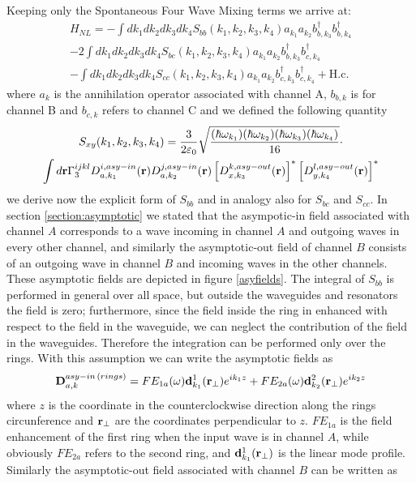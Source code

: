 Keeping only the Spontaneous Four Wave Mixing terms we arrive at:
\begin{multline}H_{NL} = -\int dk_1dk_2dk_3dk_4S_{bb}(k_1,k_2,k_3,k_4)a_{k_1}a_{k_2}b_{b,k_3}^\dagger b_{b,k_4}^\dagger \\-2\int dk_1dk_2dk_3dk_4S_{bc}(k_1,k_2,k_3,k_4)a_{k_1}a_{k_2}b_{b,k_3}^\dagger b_{c,k_4}^\dagger\\ -\int dk_1dk_2dk_3dk_4S_{cc}(k_1,k_2,k_3,k_4)a_{k_1}a_{k_2}b_{c,k_3}^\dagger b_{c,k_4}^\dagger +\text{H.c.}\end{multline}
where $a_k$ is the annihilation operator associated with channel A, $b_{b,k}$ is for channel B and $b_{c,k}$ refers to channel C and we defined the following quantity
\begin{multline}\label{S}
S_{xy}(k_1,k_2,k_3,k_4) = \frac{3}{2\varepsilon_0}\sqrt{\frac{(\hbar\omega_{k_1})(\hbar\omega_{k_2})(\hbar\omega_{k_3})(\hbar\omega_{k_4})}{16}}\cdot \\ \int d\mathbf{r} \Gamma^{ijkl}_3D^{i,asy-in}_{a,k_1}(\mathbf{r})D^{j,asy-in}_{a,k_2}(\mathbf{r})\left[D^{k,asy-out}_{x,k_3}(\mathbf{r})\right]^*\left[D^{l,asy-out}_{y,k_4}(\mathbf{r})\right]^*
\end{multline}
we derive now the explicit form of $S_{bb}$ and in analogy also for $S_{bc}$ and $S_{cc}$. In section \ref{section:asymptotic} we stated that the asympotic-in field associated with channel $A$ corresponds to a wave incoming in channel $A$ and outgoing waves in every other channel, and similarly the asymptotic-out field of channel $B$ consists of an outgoing wave in channel $B$ and incoming waves in the other channels. These asymptotic fields are depicted in figure \ref{asyfields}. The integral of $S_{bb}$ is performed in general over all space, but outside the waveguides and resonators the field is zero; furthermore, since the field inside the ring in enhanced with respect to the field in the waveguide, we can neglect the contribution of the field in the waveguides. Therefore the integration can be performed only over the rings. With this assumption we can write the asymptotic fields as
\begin{equation}\mathbf{D}^{asy-in\,(rings)}_{a,k} = FE_{1a}(\omega) \mathbf{d}^1_{k_1}(\mathbf{r}_\perp)e^{ik_1z} + FE_{2a}(\omega) \mathbf{d}_{k_2}^2(\mathbf{r}_\perp)e^{ik_2z} \end{equation}
where $z$ is the coordinate in the counterclockwise direction along the rings circunference and $\mathbf{r}_\perp$ are the coordinates perpendicular to $z$. $FE_{1a}$ is the field enhancement of the first ring when the input wave is in channel $A$, while obviously $FE_{2a}$ refers to the second ring, and $\mathbf{d}^1_{k_1}(\mathbf{r}_\perp)$ is the linear mode profile. Similarly the asymptotic-out field associated with channel $B$ can be written as
